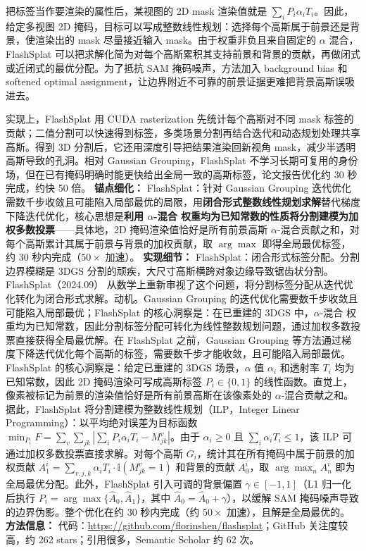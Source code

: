 把标签当作要渲染的属性后，某视图的 2D mask 渲染值就是 $\sum_i P_i \alpha_i T_i$。因此，给定多视图 2D 掩码，目标可以写成整数线性规划：选择每个高斯属于前景还是背景，使渲染出的 mask 尽量接近输入 mask。由于权重非负且来自固定的 $\alpha$ 混合，FlashSplat 可以把求解化简为对每个高斯累积其支持前景和背景的贡献，再做闭式或近闭式的最优分配。为了抵抗 SAM 掩码噪声，方法加入 background bias 和 softened optimal assignment，让边界附近不可靠的前景证据更难把背景高斯误吸进去。

实现上，FlashSplat 用 CUDA rasterization 先统计每个高斯对不同 mask 标签的贡献；二值分割可以快速得到标签，多类场景分割再结合迭代和动态规划处理共享高斯。得到 3D 分割后，它还用深度引导把结果渲染回新视角 mask，减少半透明高斯导致的孔洞。相对 Gaussian Grouping，FlashSplat 不学习长期可复用的身份场，但在已有掩码明确时能更快给出全局一致的高斯标签，论文报告优化约 30 秒完成，约快 50 倍。
\textbf{锚点细化：} FlashSplat：针对 Gaussian Grouping 迭代优化需数千步收敛且可能陷入局部最优的局限，用\textbf{闭合形式整数线性规划求解}替代梯度下降迭代优化，核心思想是\textbf{利用 $\alpha$-混合 权重均为已知常数的性质将分割建模为加权多数投票}——具体地，2D 掩码渲染值恰好是所有前景高斯 $\alpha$-混合贡献之和，对每个高斯累计其属于前景与背景的加权贡献，取 $\arg\max$ 即得全局最优标签，约 30 秒内完成（$50\times$ 加速）。
\textbf{实现细节：} FlashSplat：闭合形式标签分配。分割边界模糊是 3DGS 分割的顽疾，大尺寸高斯横跨对象边缘导致锯齿状分割。FlashSplat（2024.09） 从数学上重新审视了这个问题，将分割标签分配从迭代优化转化为闭合形式求解。动机。Gaussian Grouping 的迭代优化需要数千步收敛且可能陷入局部最优；FlashSplat 的核心洞察是：在已重建的 3DGS 中，$\alpha$-混合 权重均为已知常数，因此分割标签分配可转化为线性整数规划问题，通过加权多数投票直接获得全局最优解。在 FlashSplat 之前，Gaussian Grouping 等方法通过梯度下降迭代优化每个高斯的标签，需要数千步才能收敛，且可能陷入局部最优。FlashSplat 的核心洞察是：给定已重建的 3DGS 场景，$\alpha$ 值 $\alpha_i$ 和透射率 $T_i$ 均为已知常数，因此 2D 掩码渲染可写成高斯标签 $P_i \in \{0,1\}$ 的线性函数。直觉上，像素被标记为前景的渲染值恰好是所有前景高斯在该像素处的 $\alpha$-混合贡献之和。据此，FlashSplat 将分割建模为整数线性规划（ILP，Integer Linear Programming）：以平均绝对误差为目标函数 $\min_{P_i} F = \sum_v \sum_{jk} | \sum_i P_i \alpha_i T_i - M_{jk}^v |$。由于 $\alpha_i \geq 0$ 且 $\sum_i \alpha_i T_i \leq 1$，该 ILP 可通过加权多数投票直接求解。对每个高斯 $G_i$，统计其在所有掩码中属于前景的加权贡献 $A_1^i = \sum_{v,j,k} \alpha_i T_i \cdot \mathbb{I}(M_{jk}^v = 1)$ 和背景的贡献 $A_0^i$，取 $\arg\max_n A_n^i$ 即为全局最优分配。此外，FlashSplat 引入可调的背景偏置 $\gamma \in [-1,1]$（L1 归一化后执行 $P_i = \arg\max\{\hat{A}_0, \hat{A}_1\}$，其中 $\hat{A}_0 = \hat{A}_0 + \gamma$），以缓解 SAM 掩码噪声导致的边界伪影。整个优化在约 30 秒内完成（约 $50\times$ 加速），且解是全局最优的。
\textbf{方法信息：} 代码：\url{https://github.com/florinshen/flashsplat}；GitHub 关注度较高，约 262 stars；引用很多，Semantic Scholar 约 62 次。



